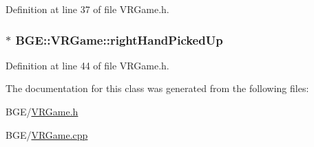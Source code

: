 Definition at line 37 of file V\-R\-Game.\-h.

\hypertarget{class_b_g_e_1_1_v_r_game_a8e9d2697bebe33f0849a5b13aa84f8b8}{
\subsubsection[{right\-Hand\-Picked\-Up}]{$\ast$ B\-G\-E\-::\-V\-R\-Game\-::right\-Hand\-Picked\-Up}}\label{class_b_g_e_1_1_v_r_game_a8e9d2697bebe33f0849a5b13aa84f8b8}


Definition at line 44 of file V\-R\-Game.\-h.



The documentation for this class was generated from the following files\-:\begin{DoxyCompactItemize}
\item 
B\-G\-E/\hyperlink{_v_r_game_8h}{V\-R\-Game.\-h}\item 
B\-G\-E/\hyperlink{_v_r_game_8cpp}{V\-R\-Game.\-cpp}\end{DoxyCompactItemize}
